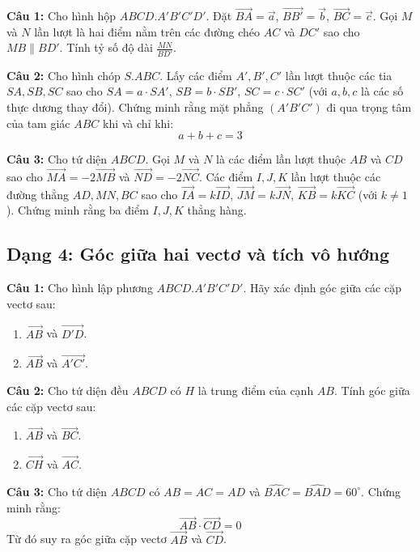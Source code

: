 \documentclass[12pt]{article}
\begin{document}
	\begin{btdo}[]
		\textbf{Câu 1:} Cho hình hộp $ABCD.A'B'C'D'$. Đặt $\overrightarrow{BA} = \vec{a}$, $\overrightarrow{BB'} = \vec{b}$, $\overrightarrow{BC} = \vec{c}$. Gọi $M$ và $N$ lần lượt là hai điểm nằm trên các đường chéo $AC$ và $DC'$ sao cho $MB \parallel BD'$. Tính tỷ số độ dài $\frac{MN}{BD'}$.
		
		\vspace{0.2cm}
		\textbf{Câu 2:} Cho hình chóp $S.ABC$. Lấy các điểm $A', B', C'$ lần lượt thuộc các tia $SA, SB, SC$ sao cho $SA = a \cdot SA'$, $SB = b \cdot SB'$, $SC = c \cdot SC'$ (với $a, b, c$ là các số thực dương thay đổi). Chứng minh rằng mặt phẳng $(A'B'C')$ đi qua trọng tâm của tam giác $ABC$ khi và chỉ khi:
		$$ a + b + c = 3 $$
		
		\vspace{0.2cm}
		\textbf{Câu 3:} Cho tứ diện $ABCD$. Gọi $M$ và $N$ là các điểm lần lượt thuộc $AB$ và $CD$ sao cho $\overrightarrow{MA} = -2\overrightarrow{MB}$ và $\overrightarrow{ND} = -2\overrightarrow{NC}$. Các điểm $I, J, K$ lần lượt thuộc các đường thẳng $AD, MN, BC$ sao cho $\overrightarrow{IA} = k\overrightarrow{ID}$, $\overrightarrow{JM} = k\overrightarrow{JN}$, $\overrightarrow{KB} = k\overrightarrow{KC}$ (với $k \neq 1$). Chứng minh rằng ba điểm $I, J, K$ thẳng hàng.
	\end{btdo}
	
	\subsection{Dạng 4: Góc giữa hai vectơ và tích vô hướng}
	
	\begin{btxanh}[]
		\textbf{Câu 1:} Cho hình lập phương $ABCD.A'B'C'D'$. Hãy xác định góc giữa các cặp vectơ sau:
		\begin{enumerate}[label=\alph*)]
			\item $\overrightarrow{AB}$ và $\overrightarrow{D'D}$.
			\item $\overrightarrow{AB}$ và $\overrightarrow{A'C'}$.
		\end{enumerate}
		
		\vspace{0.2cm}
		\textbf{Câu 2:} Cho tứ diện đều $ABCD$ có $H$ là trung điểm của cạnh $AB$. Tính góc giữa các cặp vectơ sau:
		\begin{enumerate}[label=\alph*)]
			\item $\overrightarrow{AB}$ và $\overrightarrow{BC}$.
			\item $\overrightarrow{CH}$ và $\overrightarrow{AC}$.
		\end{enumerate}
		
		\vspace{0.2cm}
		\textbf{Câu 3:} Cho tứ diện $ABCD$ có $AB = AC = AD$ và $\widehat{BAC} = \widehat{BAD} = 60^\circ$. Chứng minh rằng:
		$$ \overrightarrow{AB} \cdot \overrightarrow{CD} = 0 $$
		Từ đó suy ra góc giữa cặp vectơ $\overrightarrow{AB}$ và $\overrightarrow{CD}$.
	\end{btxanh}
	
\end{document}
